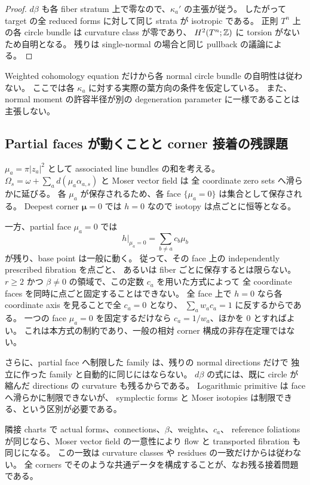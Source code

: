 \begin{proof}
$d\beta$ も各 fiber stratum 上で零なので、$\kappa_a'$ の主張が従う。
したがって target の全 reduced forms に対して同じ strata が isotropic である。
正則 $T^n$ 上の各 circle bundle は curvature class が零であり、
$H^2(T^n;\mathbb Z)$ に torsion がないため自明となる。
残りは single-normal の場合と同じ pullback の議論による。
\end{proof}

Weighted cohomology equation だけから各 normal circle bundle の自明性は従わない。
ここでは各 $\kappa_a$ に対する実際の葉方向の条件を仮定している。
また、normal moment の許容半径が別の degeneration parameter に一様であることは主張しない。

\subsection{Partial faces が動くことと corner 接着の残課題}
\label{mc:faces}

$\mu_a=\pi|z_a|^2$ として associated line bundles の和を考える。
$\Omega_s=\omega+\sum_a d(\mu_a\alpha_{a,s})$ と Moser vector field は
全 coordinate zero sets へ滑らかに延びる。
各 $\mu_a$ が保存されるため、各 face $\{\mu_a=0\}$ は集合として保存される。
Deepest corner $\boldsymbol\mu=0$ では $h=0$ なので isotopy は点ごとに恒等となる。

一方、partial face $\mu_a=0$ では
\[
 h|_{\mu_a=0}=\sum_{b\ne a}c_b\mu_b
\]
が残り、base point は一般に動く。
従って、その face 上の independently prescribed fibration を点ごと、
あるいは fiber ごとに保存するとは限らない。
$r\ge2$ かつ $\beta\ne0$ の領域で、この定数 $c_a$ を用いた方式によって
全 coordinate faces を同時に点ごと固定することはできない。
全 face 上で $h=0$ なら各 coordinate axis を見ることで全 $c_a=0$ となり、
$\sum_aw_ac_a=1$ に反するからである。
一つの face $\mu_a=0$ を固定するだけなら $c_a=1/w_a$、ほかを $0$ とすればよい。
これは本方式の制約であり、一般の相対 corner 構成の非存在定理ではない。

さらに、partial face へ制限した family は、残りの normal directions だけで
独立に作った family と自動的に同じにはならない。
$d\beta$ の式には、既に circle が縮んだ directions の curvature も残るからである。
Logarithmic primitive は face へ滑らかに制限できないが、
symplectic forms と Moser isotopies は制限できる、という区別が必要である。

隣接 charts で actual forms、connections、$\beta$、weights、$c_a$、
reference foliations が同じなら、Moser vector field の一意性により
flow と transported fibration も同じになる。
この一致は curvature classes や residues の一致だけからは従わない。
全 corners でそのような共通データを構成することが、なお残る接着問題である。
